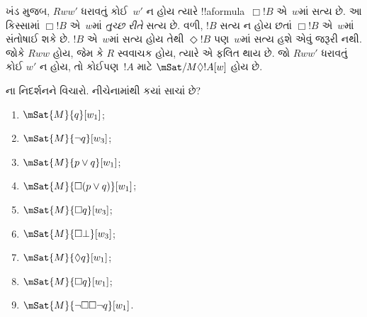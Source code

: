 \documentclass[../../../include/open-logic-section]{subfiles}
\begin{document}
 ખંડ મુજબ, $Rww'$ ધરાવતું
કોઈ~$w'$ ન હોય ત્યારે !!a{formula}~$\Box
!B$ એ~$w$માં સત્ય છે. આ કિસ્સામાં $\Box !B$
એ~$w$માં \emph{તુચ્છ રીતે} સત્ય છે. વળી,
$!B$ સત્ય ન હોય છતાં $\Box !B$ એ~$w$માં સંતોષાઈ શકે છે.
$!B$ એ~$w$માં સત્ય હોય તેથી $\Diamond !B$ પણ~$w$માં
સત્ય હશે એવું જરૂરી નથી. જોકે $Rww$ હોય, જેમ કે
$R$ સ્વવાચક હોય, ત્યારે એ ફલિત થાય છે. જો $Rww'$
ધરાવતું કોઈ $w'$ ન હોય, તો કોઈપણ~$!A$ માટે
$\mSat/{M}{\Diamond !A}[w]$ હોય છે.

\begin{prob}
  ના નિદર્શનને વિચારો.
  નીચેનામાંથી કયાં સાચાં છે?
    \begin{enumerate}
    \item $\mSat{M}{q}[w_1]$;
    \item $\mSat{M}{\lnot q}[w_3]$;
    \item $\mSat{M}{p \lor q}[w_1]$;
    \item $\mSat{M}{\Box (p \lor q)}[w_1]$;
    \item $\mSat{M}{\Box q}[w_3]$;
    \item $\mSat{M}{\Box \bot}[w_3]$;
    \item $\mSat{M}{\Diamond q}[w_1]$;
    \item $\mSat{M}{\Box q}[w_1]$;
    \item $\mSat{M}{\lnot \Box\Box \lnot q}[w_1]$.
    \end{enumerate}
\end{prob}
\end{document}
